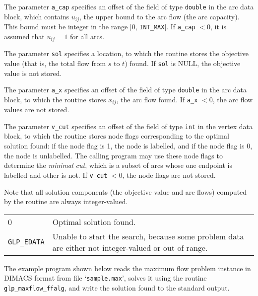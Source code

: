 \documentclass[11pt]{report}
\makeatletter
\def\para#1{\noindent{\bf#1}}
\def\returns{\para{Returns}}
\newenvironment{retlist}
{  \def\arraystretch{1.5}
   \noindent
   \begin{tabular}{@{}p{1in}@{}p{5.5in}@{}}
}
{\end{tabular}}
\makeatother
\begin{document}
\newpage

The parameter \verb|a_cap| specifies an offset of the field of type
\verb|double| in the arc data block, which contains $u_{ij}$, the upper
bound to the arc flow (the arc capacity). This bound must be integer in
the range [0, \verb|INT_MAX|]. If \verb|a_cap| $<0$, it is assumed that
$u_{ij}=1$ for all arcs.

The parameter \verb|sol| specifies a location, to which the routine
stores the objective value (that is, the total flow from $s$ to $t$)
found. If \verb|sol| is NULL, the objective value is not stored.

The parameter \verb|a_x| specifies an offset of the field of type
\verb|double| in the arc data block, to which the routine stores
$x_{ij}$, the arc flow found. If \verb|a_x| $<0$, the arc flow values
are not stored.

The parameter \verb|v_cut| specifies an offset of the field of type
\verb|int| in the vertex data block, to which the routine stores node
flags corresponding to the optimal solution found: if the node flag is
1, the node is labelled, and if the node flag is 0, the node is
unlabelled. The calling program may use these node flags to determine
the {\it minimal cut}, which is a subset of arcs whose one endpoint is
labelled and other is not. If \verb|v_cut| $<0$, the node flags are not
stored.

Note that all solution components (the objective value and arc flows)
computed by the routine are always integer-valued.

\returns

\begin{retlist}
0 & Optimal solution found.\\

\verb|GLP_EDATA| & Unable to start the search, because some problem
data are either not integer-valued or out of range.\\
\end{retlist}

\para{Example}

The example program shown below reads the maximum flow problem instance
in DIMACS format from file `\verb|sample.max|', solves it using the
routine \verb|glp_maxflow_ffalg|, and write the solution found to the
standard output.
\end{document}
